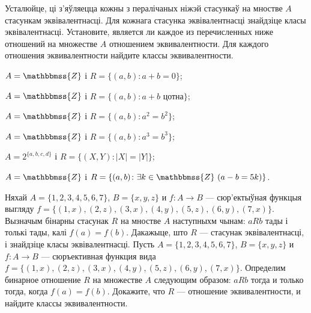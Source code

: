 \begin{problemList}
\problemItemWithCommonPart
{Усталюйце, ці з'яўляецца кожны з пералічаных ніжэй стасункаў на мностве $A$ стасункам эквівалентнасці. Для кожнага стасунка эквівалентнасці знайдзіце класы эквівалентнасці.}
{Установите, является ли каждое из перечисленных ниже отношений на множестве $A$ отношением эквивалентности. Для каждого отношения эквивалентности найдите классы эквивалентности.}
{%
\begin{belarusianEnumerate}
	
\item $A = \mathbbmss{Z}$ і $R = \{(a, b) \colon a + b = 0\}$;

\item $A = \mathbbmss{Z}$ і $R = \{(a, b) \colon a + b \,\,\text{цотна}\}$;

\item $A = \mathbbmss{Z}$ і $R = \{(a, b) \colon a^2 = b^2\}$;

\item $A = \mathbbmss{Z}$ і $R = \{(a, b) \colon a^3 = b^3\}$;

\item $A = 2^{\{a, b, c, d\}}$ і $R = \{(X, Y) \colon |X| = |Y|\}$;

\item $A = \mathbbmss{Z}$ і $R = \{(a, b) \colon \exists k \in \mathbbmss{Z} \,\, (a - b = 5k)\}$.
	
\end{belarusianEnumerate}
}

\bigskip

\problemItemSimple
{Няхай $A = \{1, 2, 3, 4, 5, 6, 7\}$, $B = \{x, y, z\}$ и $f \colon A \to B$ --- сюр'ектыўная функцыя выгляду $f = \{(1, x), (2, z), (3, x), (4, y), (5, z), (6, y), (7, x)\}$.
Вызначым бінарны стасунак $R$ на мностве $A$ наступныхм чынам: $aRb$ тады і толькі тады, калі $f(a) = f(b)$. Дакажыце, што $R$ ---  стасунак эквівалентнасці, і знайдзіце класы эквівалентнасці.}
{Пусть $A = \{1, 2, 3, 4, 5, 6, 7\}$, $B = \{x, y, z\}$ и $f \colon A \to B$ ---
сюръективная функция вида $f = \{(1, x), (2, z), (3, x), (4, y), (5, z), (6, y), (7, x)\}$.
Определим бинарное отношение $R$ на множестве $A$ следующим образом: $aRb$ тогда и только тогда, когда $f(a) = f(b)$. Докажите, что $R$ --- отношение эквивалентности, и найдите классы эквивалентности.}
	
\end{problemList}

